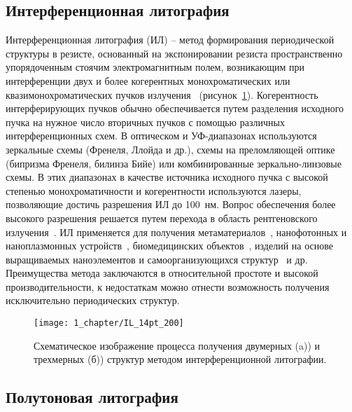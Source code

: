 \subsection{Интерференционная литография}

Интерференционная литография (ИЛ) -- метод формирования периодической структуры в резисте, основанный на экспонировании резиста пространственно упорядоченным стоячим электромагнитным полем, возникающим при интерференции двух и более когерентных монохроматических или квазимонохроматических пучков излучения~\cite{IL_general} (рисунок~\ref{fig:IL}). Когерентность интерферирующих пучков обычно обеспечивается путем разделения исходного пучка на нужное число вторичных пучков с помощью различных интерференционных схем. В оптическом и УФ-диапазонах используются зеркальные схемы (Френеля, Ллойда и др.), схемы на преломляющей оптике (бипризма Френеля, билинза Бийе) или комбинированные зеркально-линзовые схемы. В этих диапазонах в качестве источника исходного пучка с высокой степенью монохроматичности и когерентности используются лазеры, позволяющие достичь разрешения ИЛ до 100~нм. Вопрос обеспечения более высокого разрешения решается путем перехода в область рентгеновского излучения~\cite{IL_X-ray}. ИЛ применяется для получения  метаматериалов~\cite{IL_metamaterials}, нанофотонных и наноплазмонных устройств~\cite{IL_nanophotonics}, биомедицинских объектов~\cite{IL_biomedical}, изделий на основе выращиваемых наноэлементов и самоорганизующихся структур~\cite{IL_self-assembly} и др. Преимущества метода заключаются в относительной простоте и высокой производительности, к недостаткам можно отнести возможность получения исключительно периодических структур.

\begin{figure}[t]
	\centering
	\texttt{[image: 1\_chapter/IL\_14pt\_200]}
	\vspace{0.5em}
	\caption{Схематическое изображение процесса получения двумерных (a)) и трехмерных (б)) структур методом интерференционной литографии.}
	\label{fig:IL}
\end{figure}


\subsection{Полутоновая литография}

